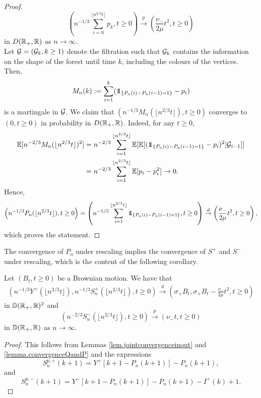 \begin{proof}
$$\left(n^{-1/3}\sum_{i=0}^{\lfloor n^{2/3}t \rfloor} p_k , t \geq 0\right)\overset{p}{\to} \left(\frac{\nu_-}{2\mu}t^2,t\geq 0\right)$$
in $D({\mathbb R}_+,{\mathbb R})$ as $n\to \infty$. \\
Let ${\mathcal G}=({\mathcal G}_k,k\geq 1)$ denote the filtration such that ${\mathcal G}_{k}$ contains the information on the shape of the forest until time $k$, including the colours of the vertices. Then, 
$$M_n(k):=\sum_{i=1}^k (\one_{\{P_n(i)-P_n(i-1)=1\}}-p_i)$$ is a martingale in ${\mathcal G}$. We claim that $(n^{-1/3}M_n(\lfloor n^{2/3} t\rfloor ), t\geq 0)$ converges to $(0,t\geq 0)$ in probability in $D({\mathbb R}_+,{\mathbb R})$. Indeed, for any $t\geq 0$,
\begin{align*}\E[n^{-2/3}M_n(\lfloor n^{2/3} t\rfloor )^2]&=n^{-2/3}\sum_{i=1}^{\lfloor n^{2/3} t\rfloor} \E[\E[(\one_{\{P_n(i)-P_n(i-1)=1\}}-p_i)^2|\cG_{i-1}]]\\&=n^{-2/3}\sum_{i=1}^{\lfloor n^{2/3} t\rfloor} \E[p_i-p_i^2]\to 0.\end{align*}
Hence,
$$\left(n^{-1/3}P_n(\lfloor n^{2/3}t\rfloor), t\geq 0\right)=\left(n^{-1/3}\sum_{i=1}^{\lfloor n^{2/3}t\rfloor}  \one_{\{P_n(i)-P_n(i-1)=1\}}  , t\geq 0\right)\overset{d}{\to} \left( \frac{\nu_-}{2\mu}t^2, t\geq 0 \right),$$
 which proves the statement.

\end{proof}

The convergence of $P_n$ under rescaling implies the convergence of $S^{+}$ and $S^{-}$ under rescaling, which is the content of the following corollary. 

\begin{corollary}\label{cor.lukasiewiczpathpurplevertices}
 Let $(B_t,t\geq 0)$ be a Brownian motion. We have that 
 \begin{align*}\left(n^{-1/3}Y^{+}\left(\lfloor n^{2/3}t\rfloor\right), n^{-1/3}S^{+}_n\left(\lfloor n^{2/3}t\rfloor\right), t\geq 0\right)\overset{d}{\to}\left(\sigma_+B_t,\sigma_+B_t-\frac{\nu_-}{2\mu}t^2,  t\geq 0\right)\end{align*}
 in ${\mathbb D}({\mathbb R}_+,{\mathbb R})^2$  and 
 $$\left(n^{-2/3}S^{-}_n\left(\lfloor n^{2/3}t\rfloor\right),t\geq 0\right)\overset{p}{\to}\left(\nu_- t,t\geq 0\right)$$
 in ${\mathbb D}({\mathbb R}_+,{\mathbb R})$ as $n\to\infty$.
\end{corollary}
\begin{proof}
 This follows from Lemmas \ref{lem.jointconvergenceinout} and \ref{lemma.convergenceQandP} and the expressions 
 $$S_n^{p,+}(k+1)=Y^+\left[k+1-P_n(k+1)\right]-P_n(k+1),$$ and $$S_n^{p,-}(k+1)=Y^-\left[k+1-P_n(k+1)\right]-P_n(k+1)-I^{+}(k)+1.$$
\end{proof}

